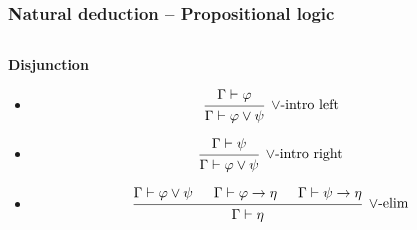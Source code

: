 \documentclass{beamer}
\begin{document}
\begin{frame}
  \frametitle{Natural deduction -- Propositional logic}
  \begin{columns}

     \begin{column}{.6\textwidth}
      \textbf{\qquad Disjunction}
      \minipage[c][0.6\textheight][s]{\columnwidth}
      \vspace{0.05\textheight}
      \begin{itemize}
      \item
      \[
        \begin{prooftree}
          \hypo{\Gamma \vdash \varphi}
          \infer1[$\vee$-intro left]{\Gamma \vdash \varphi \vee \psi}
        \end{prooftree}
      \]

      \item
      \[
        \begin{prooftree}
          \hypo{\Gamma \vdash \psi}
          \infer1[$\vee$-intro right]{\Gamma \vdash \varphi \vee \psi}
        \end{prooftree}
      \]

      \item
      \[
        \begin{prooftree}
          \hypo{\Gamma \vdash \varphi \vee \psi}
          \hypo{\Gamma \vdash \varphi \rightarrow \eta}
          \hypo{\Gamma \vdash \psi \rightarrow \eta}
          \infer3[$\vee$-elim]{\Gamma \vdash \eta}
        \end{prooftree}
      \]
      \end{itemize}
      \endminipage
    \end{column}

  \end{columns}
\end{frame}
\end{document}
